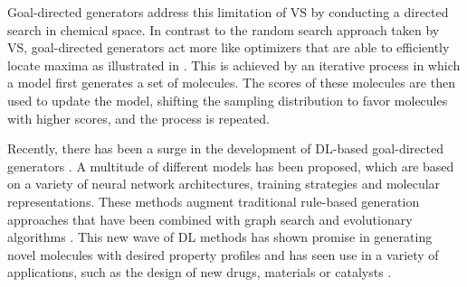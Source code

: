 Goal-directed generators address this limitation of \ac{VS} by conducting a directed search in
chemical space. In contrast to the random search approach taken by \ac{VS}, goal-directed generators
act more like optimizers that are able to efficiently locate maxima as illustrated in
. This is achieved by an iterative process in which a model
first generates a set of molecules. The scores of these molecules are then used to update the model,
shifting the sampling distribution to favor molecules with higher scores, and the process is
repeated.

Recently, there has been a surge in the development of \ac{DL}-based goal-directed generators
\citep{eltonDeepLearningMolecular2019,sanchez-lengelingInverseMolecularDesign2018,duMachineLearningaidedGenerative2024}.
A multitude of different models has been proposed, which are based on a variety of neural network
architectures, training strategies and molecular representations. These methods augment traditional
rule-based generation approaches that have been combined with graph search and evolutionary
algorithms \citep{schneiderComputerbasedNovoDesign2005,schneiderNovoMolecularDesign2013}. This new
wave of \ac{DL} methods has shown promise in generating novel molecules with desired
property profiles and has seen use in a variety of applications, such as the design of new drugs,
materials or catalysts \citep{zhavoronkovDeepLearningEnables2019,anstineGenerativeModelsEmerging2023,zahrtPredictionHigherselectivityCatalysts2019,daveAutonomousDiscoveryBattery2020,kimDatadrivenElectrolyteDesign2023,moonActiveLearningGuides2024}.

